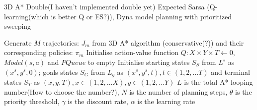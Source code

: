 \documentclass{article}
\begin{document}
\begin{algorithm*}[t]
\caption{3D A* Double{\color{red}(I haven't implemented double yet)} {\color{blue}Expected Sarsa} (Q-learning{\color{red}(which is better Q or ES?)}), Dyna model planning with prioritized sweeping}\label{main_algorithm}
\LinesNumbered
\SetAlgoLined
\SetAlgoNoEnd
\DontPrintSemicolon
{}

Generate $M$ trajectories: $J_m$ from 3D A* algorithm (conservative{\color{red}(?)}) and their corresponding policies: $\pi_m$ \;
Initialise action-value function $Q : X \times Y \times T \leftarrow 0$, $Model(s,a)$ and $PQueue$ to empty \;
Initialise starting states $S_S$ from $L^s$ as $(x^s, y^s, 0)$; goals states $S_G$ from $L_g$ as ${(x^s, y^s, t)}, t \in(1,2,\ldots T)$ and terminal states $S_T$ as ${(x, y, T)}, x \in(1,2,\ldots X), y \in(1,2,\ldots Y)$\;
$L$ is the total A* looping number{\color{red}(How to choose the number?)}, $N$ is the number of planning steps, $\theta$ is the priority threshold, $\gamma$ is the discount rate, $\alpha$ is the learning rate \;


\end{algorithm*}
\end{document}
